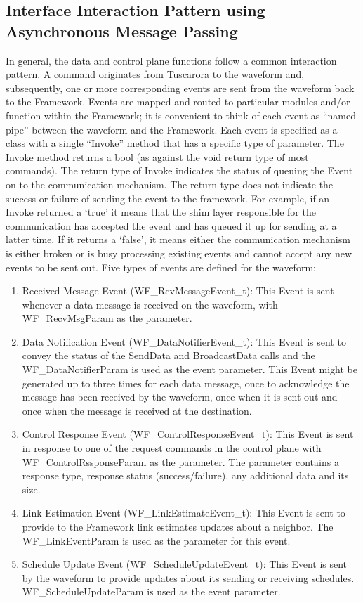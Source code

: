 \subsection {Interface Interaction Pattern using Asynchronous Message Passing}
In general, the data and control plane functions follow a common interaction pattern.  A command originates from Tuscarora to the waveform and, subsequently, one or more corresponding events are sent from the waveform back to the Framework.  Events are mapped and routed to particular modules and/or function within the Framework; it is convenient to think of each event as “named pipe” between the waveform and the Framework.  Each event is specified as a class with a single “Invoke” method that has a specific type of parameter. The Invoke method returns a bool (as against the void return type of most commands). The return type of Invoke indicates the status of queuing the Event on to the communication mechanism. The return type does not indicate the success or failure of sending the event to the framework. For example, if an Invoke returned a ‘true’ it means that the shim layer responsible for the communication has accepted the event and has queued it up for sending at a latter time. If it returns a ‘false’, it means either the communication mechanism is either broken or is busy processing existing events and cannot accept any new events to be sent out.
Five types of events are defined for the waveform:
\begin{enumerate}
\item Received Message Event (WF\_RcvMessageEvent\_t):  This Event is sent whenever a data message is received on the waveform, with WF\_RecvMsgParam  as the parameter.
\item	Data Notification Event (WF\_DataNotifierEvent\_t):  This Event is sent to convey the status of the SendData and BroadcastData calls and the WF\_DataNotifierParam is used as the event parameter. This Event might be generated up to three times for each data message, once to acknowledge the message has been received by the waveform, once when it is sent out and once when the message is received at the destination.
\item	Control Response Event (WF\_ControlResponseEvent\_t):  This Event is sent in response to one of the request commands in the control plane with WF\_ControlRssponseParam as the parameter. The parameter contains a response type, response status (success/failure), any additional data and its size.
\item	Link Estimation Event (WF\_LinkEstimateEvent\_t):  This Event is sent to provide to the Framework link estimates updates about a neighbor. The WF\_LinkEventParam is used as the parameter for this event.
\item	Schedule Update Event (WF\_ScheduleUpdateEvent\_t):  This Event is sent by the waveform to provide updates about its sending or receiving schedules. WF\_ScheduleUpdateParam is used as the event parameter.
\end{enumerate}

